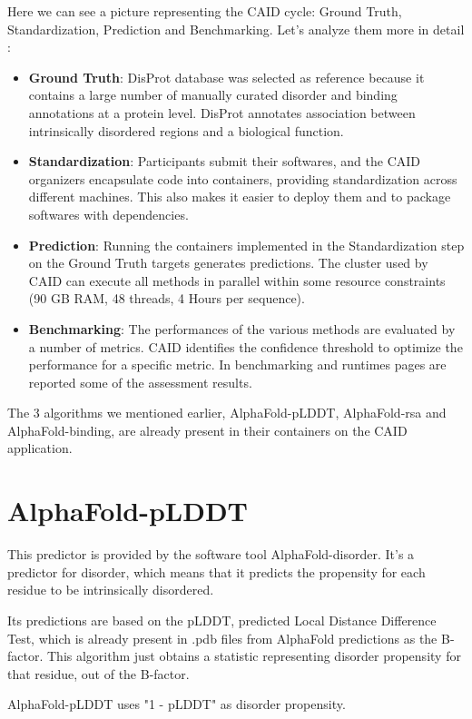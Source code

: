 Here we can see a picture representing the CAID cycle: Ground Truth, Standardization, Prediction and Benchmarking. Let's analyze them more in detail :
\begin{itemize}
    \item \textbf{Ground Truth}: DisProt database was selected as reference because it contains a large number of manually curated disorder and binding annotations at a protein level. DisProt annotates association between intrinsically disordered regions and a biological function.
    \item \textbf{Standardization}: Participants submit their softwares, and the CAID organizers encapsulate code into containers, providing standardization across different machines. This also makes it easier to deploy them and to package softwares with dependencies.
    \item \textbf{Prediction}: Running the containers implemented in the Standardization step on the Ground Truth targets generates predictions. The cluster used by CAID can execute all methods in parallel within some resource constraints (90 GB RAM, 48 threads, 4 Hours per sequence).
    \item \textbf{Benchmarking}: The performances of the various methods are evaluated by a number of metrics. CAID identifies the confidence threshold to optimize the performance for a specific metric. In benchmarking and runtimes pages are reported some of the assessment results.
\end{itemize}

The 3 algorithms we mentioned earlier, AlphaFold-pLDDT, AlphaFold-rsa and AlphaFold-binding, are already present in their containers on the CAID application.

\section{AlphaFold-pLDDT}
This predictor is provided by the software tool AlphaFold-disorder. It's a predictor for disorder, which means that it predicts the propensity for each residue to be intrinsically disordered.

Its predictions are based on the pLDDT, predicted Local Distance Difference Test, which is already present in .pdb files from AlphaFold predictions as the B-factor. This algorithm just obtains a statistic representing disorder propensity for that residue, out of the B-factor.

AlphaFold-pLDDT uses "1 - pLDDT" as disorder propensity. 


